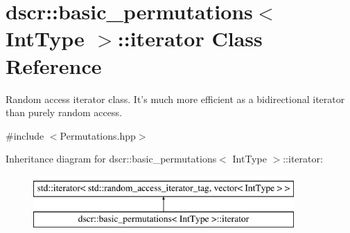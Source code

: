 \hypertarget{classdscr_1_1basic__permutations_1_1iterator}{\section{dscr\-:\-:basic\-\_\-permutations$<$ Int\-Type $>$\-:\-:iterator Class Reference}
\label{classdscr_1_1basic__permutations_1_1iterator}
}


Random access iterator class. It's much more efficient as a bidirectional iterator than purely random access.  




{\ttfamily \#include $<$Permutations.\-hpp$>$}

Inheritance diagram for dscr\-:\-:basic\-\_\-permutations$<$ Int\-Type $>$\-:\-:iterator\-:\begin{figure}[H]
\begin{center}
\leavevmode
\includegraphics[height=2.000000cm]{classdscr_1_1basic__permutations_1_1iterator}
\end{center}
\end{figure}
